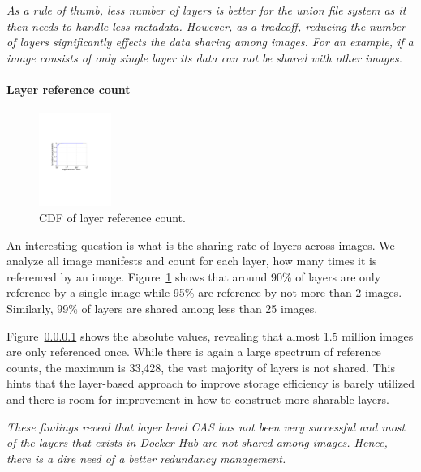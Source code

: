 \emph{As a rule of thumb, less number of layers is better for the union file
	system as it then needs to handle less metadata. However, as a tradeoff,
	reducing the number of layers significantly effects the data sharing among images.
	For an example, if a image consists of only single layer its data can not be shared
	with other images.}
%

\paragraph{Layer reference count}

\begin{figure}
	\centering
	\includegraphics[width=0.21\textwidth]{graphs/shared-cnt-cdf.pdf}
	\caption{CDF of layer reference count.
	}
	\label{fig:ref_count}
\end{figure}

An interesting question is what is the sharing rate of layers across images.
We analyze all image manifests and count for each layer, how many times it is
referenced by an image. Figure~\ref{fig:ref_count} shows that around 90\% of
layers are only reference by a single image while 95\% are reference by not
more than 2 images. Similarly, 99\% of layers are shared among less than 25
images. 

Figure~\ref{} shows the absolute values, revealing that
almost 1.5 million images are only referenced once.   While there is again a large spectrum of reference counts, the maximum
is 33,428, the vast majority of layers is not shared. This hints that the
layer-based approach to improve storage efficiency is barely utilized and there
is room for improvement in how to construct more sharable layers.

\emph{These findings reveal that layer level CAS has not been very successful
	and most of the layers that exists in Docker Hub are not shared among images.
	Hence, there is a dire need of a better redundancy management.}

